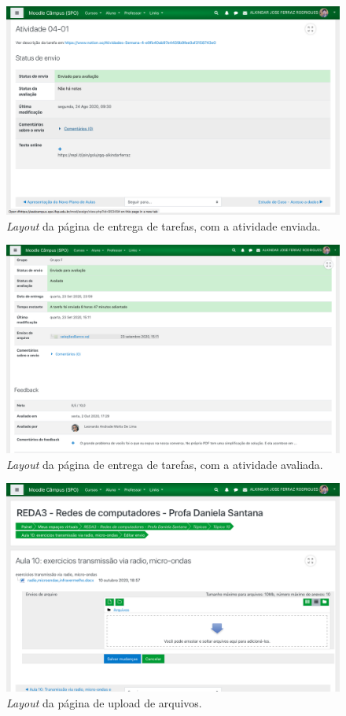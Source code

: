 \documentclass[11pt]{article}
\begin{document}
\begin{figure}[htbp]
\centering
\includegraphics[width=.9\linewidth]{./media/entrega_2.png}
\caption{\label{fig:org21f627b}\emph{Layout} da página de entrega de tarefas, com a atividade enviada.}
\end{figure}
\begin{figure}[htbp]
\centering
\includegraphics[width=.9\linewidth]{./media/entrega_3.png}
\caption{\label{fig:org24e3be8}\emph{Layout} da página de entrega de tarefas, com a atividade avaliada.}
\end{figure}
\begin{figure}[htbp]
\centering
\includegraphics[width=.9\linewidth]{./media/arquivos_1.png}
\caption{\label{fig:orga7abf63}\emph{Layout} da página de upload de arquivos.}
\end{figure}
\end{document}
